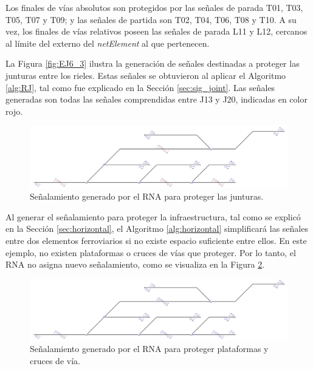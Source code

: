	Los finales de vías absolutos son protegidos por las señales de parada T01, T03, T05, T07 y T09; y las señales de partida son T02, T04, T06, T08 y T10. A su vez, los finales de vías relativos poseen las señales de parada L11 y L12, cercanos al límite del externo del \textit{netElement} al que pertenecen.
	
	La Figura \ref{fig:EJ6_3} ilustra la generación de señales destinadas a proteger las junturas entre los rieles. Estas señales se obtuvieron al aplicar el Algoritmo \ref{alg:RJ}, tal como fue explicado en la Sección \ref{sec:sig_joint}. Las señales generadas son todas las señales comprendidas entre J13 y J20, indicadas en color rojo.

	\begin{figure}[H]
		\centering
		\includegraphics[width=1\textwidth]{resultados-obtenidos/ejemplo6/images/6_step2.png}
		\centering\caption{Señalamiento generado por el RNA para proteger las junturas.}
		\label{fig:EJ6_4}
	\end{figure}
	
	Al generar el señalamiento para proteger la infraestructura, tal como se explicó en la Sección \ref{sec:horizontal}, el Algoritmo \ref{alg:horizontal} simplificará las señales entre dos elementos ferroviarios si no existe espacio suficiente entre ellos. En este ejemplo, no existen plataformas o cruces de vías que proteger. Por lo tanto, el RNA no asigna nuevo señalamiento, como se visualiza en la Figura \ref{fig:EJ6_5}.

	\begin{figure}[H]
		\centering
		\includegraphics[width=1\textwidth]{resultados-obtenidos/ejemplo6/images/6_step3.png}
		\centering\caption{Señalamiento generado por el RNA para proteger plataformas y cruces de vía.}
		\label{fig:EJ6_5}
	\end{figure}

